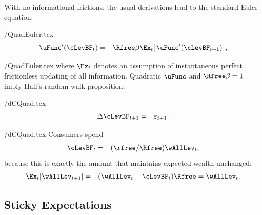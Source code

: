\documentclass[titlepage]{\econtex}
\begin{document}
With no informational frictions, the usual derivations lead to the standard Euler equation:
\begin{verbatimwrite}{\eq/QuadEuler.tex}
\begin{eqnarray*}
  \uFunc^{\prime}(\cLevBF_{t}) & = & \Rfree\beta \Ex_{t}\big[\uFunc^{\prime}(\cLevBF_{t+1})\big], \label{eq:QuadEuler}
\end{eqnarray*}
\end{verbatimwrite}
 \eq/QuadEuler.tex
where $\Ex_{t}$ denotes an assumption of instantaneous perfect frictionless updating of all information. Quadratic $\uFunc$ and $\Rfree \beta=1$ imply Hall's random walk proposition:
\begin{verbatimwrite}{\eq/dCQuad.tex}
\begin{eqnarray*}
  \Delta \cLevBF_{t+1} & = & \varepsilon_{t+1} \label{eq:dCQuad}.
\end{eqnarray*}
\end{verbatimwrite}
 \eq/dCQuad.tex
Consumers spend
\begin{eqnarray*}
  \cLevBF_{t} & = & (\rfree/\Rfree) \wAllLev_{t}, \label{eq:cquad}
\end{eqnarray*}
because this is exactly the amount that maintains expected wealth unchanged:
\begin{eqnarray*}
  \Ex_{t}[\wAllLev_{t+1}] & = & (\wAllLev_{t}-\cLevBF_{t})\Rfree = \wAllLev_{t}
.
\end{eqnarray*}


\subsection{Sticky Expectations}
\end{document}
